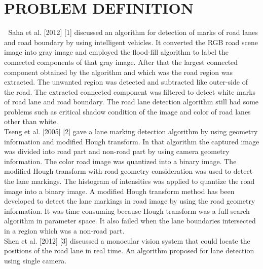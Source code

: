 \documentclass[oneside,a4paper,12pt]{report}
\begin{document}
\chapter{PROBLEM DEFINITION}
\hspace*{0.3 in}	Saha et al. [2012] [1] discussed an algorithm for detection of marks of road lanes and road boundary by using intelligent vehicles. It converted the RGB road scene image into gray image and employed the flood-fill algorithm to label the connected components of that gray image. After that the largest connected component obtained by the algorithm and which was the road region was extracted. The unwanted region was detected and subtracted like outer-side of the road. The extracted connected component was filtered to detect white marks of road lane and road boundary. The road lane detection algorithm still had some problems such as critical shadow condition of the image and color of road lanes other than white.\\
Tseng et al. [2005] [2] gave a lane marking detection algorithm by using geometry information and modified Hough transform. In that algorithm the captured image was divided into road part and non-road part by using camera geometry information. The color road image was quantized into a binary image. The modified Hough transform with road geometry consideration was used to detect the lane markings. The histogram of intensities was applied to quantize the road image into a binary image. A modified Hough transform method has been developed to detect the lane markings in road image by using the road geometry information. It was time consuming because Hough transform was a full search algorithm in parameter space. It also failed when the lane boundaries intersected in a region which was a non-road part.\\
 Shen et al. [2012] [3] discussed a monocular vision system that could locate the positions of the road lane in real time. An algorithm proposed for lane detection using single camera.

\begin{enumerate}

\end{enumerate}





\end{document}
